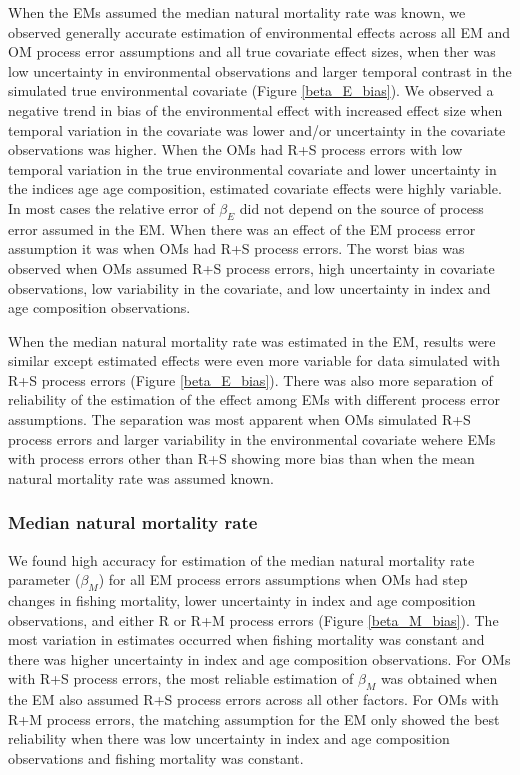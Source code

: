 \documentclass[
  12pt,
]{article}
\begin{document}
When the EMs assumed the median natural mortality rate was known, we observed generally accurate estimation of environmental effects across all EM and OM process error assumptions and all true covariate effect sizes, when ther was low uncertainty in environmental observations and larger temporal contrast in the simulated true environmental covariate (Figure \ref{beta_E_bias}). We observed a negative trend in bias of the environmental effect with increased effect size when temporal variation in the covariate was lower and/or uncertainty in the covariate observations was higher. When the OMs had R+S process errors with low temporal variation in the true environmental covariate and lower uncertainty in the indices age age composition, estimated covariate effects were highly variable. In most cases the relative error of \(\beta_E\) did not depend on the source of process error assumed in the EM. When there was an effect of the EM process error assumption it was when OMs had R+S process errors. The worst bias was observed when OMs assumed R+S process errors, high uncertainty in covariate observations, low variability in the covariate, and low uncertainty in index and age composition observations.

When the median natural mortality rate was estimated in the EM, results were similar except estimated effects were even more variable for data simulated with R+S process errors (Figure \ref{beta_E_bias}). There was also more separation of reliability of the estimation of the effect among EMs with different process error assumptions. The separation was most apparent when OMs simulated R+S process errors and larger variability in the environmental covariate wehere EMs with process errors other than R+S showing more bias than when the mean natural mortality rate was assumed known.

\hypertarget{median-natural-mortality-rate}{%
\subsubsection*{Median natural mortality rate}\label{median-natural-mortality-rate}}

We found high accuracy for estimation of the median natural mortality rate parameter (\(\beta_M\)) for all EM process errors assumptions when OMs had step changes in fishing mortality, lower uncertainty in index and age composition observations, and either R or R+M process errors (Figure \ref{beta_M_bias}). The most variation in estimates occurred when fishing mortality was constant and there was higher uncertainty in index and age composition observations. For OMs with R+S process errors, the most reliable estimation of \(\beta_M\) was obtained when the EM also assumed R+S process errors across all other factors. For OMs with R+M process errors, the matching assumption for the EM only showed the best reliability when there was low uncertainty in index and age composition observations and fishing mortality was constant.
\end{document}
